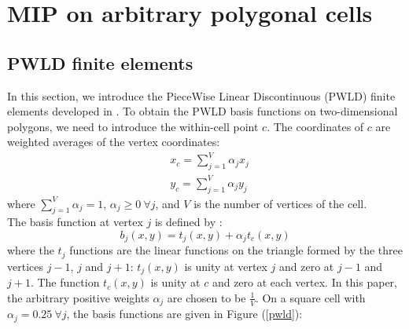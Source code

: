 \section{MIP on arbitrary polygonal cells} \label{sec_mip}
\subsection{PWLD finite elements}
In this section, we introduce the PieceWise Linear Discontinuous (PWLD) finite
elements developed in \cite{pwld_2d,pwld_3d}. To obtain the PWLD basis
functions on two-dimensional polygons, we need to introduce the within-cell
point $c$. The coordinates of $c$ are weighted averages of the vertex coordinates:
\begin{align}
& x_c = \sum_{j=1}^{V} \alpha_{j} x_j\\
& y_c = \sum_{j=1}^{V} \alpha_{j} y_j
\end{align}
where $\sum_{j=1}^{V} \alpha_{j}=1$, $\alpha_j \geq 0\ \forall j$, and $V$ is 
the number of vertices of the cell.\\
The basis function at vertex $j$ is defined by \cite{pwld_2d}:
\begin{equation}
b_{j} (x,y) = t_{j}(x,y) + \alpha_j t_c(x,y)
\end{equation}
where the $t_j$ functions are the linear functions on the triangle formed
by the three vertices $j-1$, $j$ and $j+1$: $t_j (x,y)$ is unity at vertex $j$
and zero at $j-1$ and $j+1$. The function $t_c(x,y)$ is unity at $c$ 
and zero at each vertex. In this paper, the arbitrary positive weights
$\alpha_j$ are chosen to be $\frac{1}{V}$. On a square cell with 
$\alpha_{j}=0.25\ \forall j$, the basis functions are given in Figure (\ref{pwld}):
